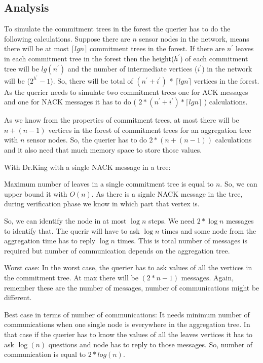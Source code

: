 \subsection{Analysis} %
\label{sub:analysis}

To simulate the commitment trees in the forest the querier has to do the following calculations. Suppose there are $n$ sensor nodes in the network, means there will be at most $\lceil lg n \rceil$ commitment trees in the forest. If there are $n^{'}$ leaves in each commitment tree in the forest then the height($h^{'}$) of each commitment tree will be $lg(n^{'})$ and the number of intermediate vertices ($i^{'}$) in the network will be ($ 2^{h^{'}} - 1 $). So, there will be total of  $ (n^{'} + i^{'}) $ * $\lceil lg  n \rceil $  vertices in the forest. As the querier needs to simulate two commitment trees one for ACK messages and one for NACK messages it has to do ( $ 2 * (n^{'} + i^{'}) * \lceil lg  n \rceil $ ) calculations.

As we know from the properties of commitment trees, at most there 
will be $n + ( n - 1 )$ vertices in the forest of commitment trees 
for an aggregation tree with $n$ sensor nodes. So, the querier has
to do $ 2 * ( n + ( n - 1 ) )$ calculations and it also need that much memory space to store those values.

With Dr.King with a single NACK message in a tree:

Maximum number of leaves in a single commitment tree is equal to $n$. 
So, we can upper bound it with $O(n)$. As there is a signle NACK 
message in the tree, during verification phase we know in which part 
that vertex is. 

So, we can identify the node in at most $\log{n}$ steps.
We need $2*\log{n}$ messages to identify that. The querir will have to 
ask $\log{n}$ times and some node from the aggregation time has to 
reply $\log{n}$ times. This is total number of messages is required but 
number of communication depends on the aggregation tree.

Worst case:
In the worst case, the querier has to ask values of all the vertices in 
the commitment tree. At max there will be $(2*n - 1)$ messages. Again, 
remember these are the number of messages, number of communications 
might be different.

Best case in terms of number of communications:
It needs minimum number of communications when one single node is
everywhere in the aggregation tree. In that case if the querier has to 
know the values of all the leaves vertices it has to ask $\log(n)$ 
questions and node has to reply to those messages. So, number of 
communication is equal to $2 *log(n)$.


